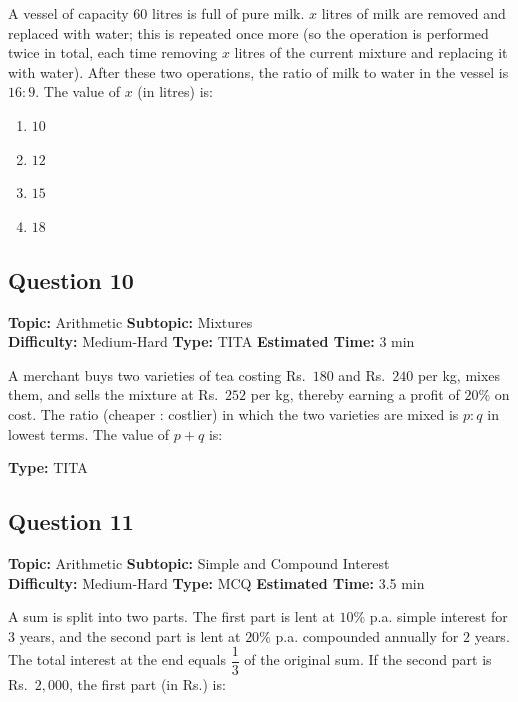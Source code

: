 \documentclass[11pt]{article}
\begin{document}
\begin{tcolorbox}
A vessel of capacity \(60\) litres is full of pure milk. \(x\) litres of milk are removed and replaced with water; this is repeated once more (so the operation is performed twice in total, each time removing \(x\) litres of the current mixture and replacing it with water). After these two operations, the ratio of milk to water in the vessel is \(16:9\). The value of \(x\) (in litres) is:
\end{tcolorbox}

\begin{enumerate}[label=(\Alph*)]
    \item \(10\)
    \item \(12\)
    \item \(15\)
    \item \(18\)
\end{enumerate}

\subsection*{Question 10}
\textbf{Topic:} Arithmetic \quad \textbf{Subtopic:} Mixtures \\
\textbf{Difficulty:} Medium-Hard \quad \textbf{Type:} TITA \quad \textbf{Estimated Time:} 3 min

\begin{tcolorbox}
A merchant buys two varieties of tea costing Rs.~\(180\) and Rs.~\(240\) per kg, mixes them, and sells the mixture at Rs.~\(252\) per kg, thereby earning a profit of \(20\%\) on cost. The ratio (cheaper : costlier) in which the two varieties are mixed is \(p:q\) in lowest terms. The value of \(p+q\) is:
\end{tcolorbox}

\textbf{Type:} TITA

\subsection*{Question 11}
\textbf{Topic:} Arithmetic \quad \textbf{Subtopic:} Simple and Compound Interest \\
\textbf{Difficulty:} Medium-Hard \quad \textbf{Type:} MCQ \quad \textbf{Estimated Time:} 3.5 min

\begin{tcolorbox}
A sum is split into two parts. The first part is lent at \(10\%\) p.a. simple interest for \(3\) years, and the second part is lent at \(20\%\) p.a. compounded annually for \(2\) years. The total interest at the end equals \(\dfrac{1}{3}\) of the original sum. If the second part is Rs.~\(2{,}000\), the first part (in Rs.) is:
\end{tcolorbox}
\end{document}
